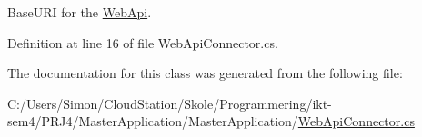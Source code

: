 Base\+U\+RI for the \mbox{\hyperlink{namespace_web_api}{Web\+Api}}. 



Definition at line 16 of file Web\+Api\+Connector.\+cs.



The documentation for this class was generated from the following file\+:\begin{DoxyCompactItemize}
\item 
C\+:/\+Users/\+Simon/\+Cloud\+Station/\+Skole/\+Programmering/ikt-\/sem4/\+P\+R\+J4/\+Master\+Application/\+Master\+Application/\mbox{\hyperlink{_web_api_connector_8cs}{Web\+Api\+Connector.\+cs}}\end{DoxyCompactItemize}
